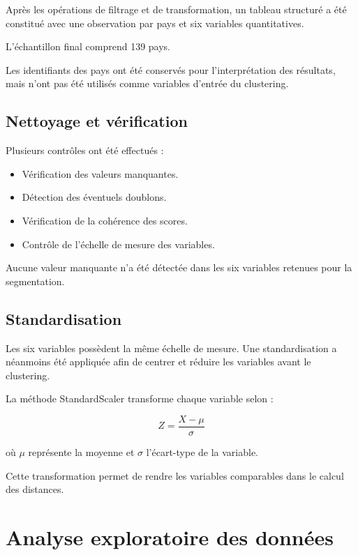 \documentclass[11pt,a4paper]{article}
\begin{document}
Après les opérations de filtrage et de transformation,
un tableau structuré a été constitué avec une observation
par pays et six variables quantitatives.

L'échantillon final comprend 139 pays.

Les identifiants des pays ont été conservés pour l'interprétation
des résultats, mais n'ont pas été utilisés comme variables
d'entrée du clustering.

\subsection{Nettoyage et vérification}

Plusieurs contrôles ont été effectués :

\begin{itemize}
    \item Vérification des valeurs manquantes.
    \item Détection des éventuels doublons.
    \item Vérification de la cohérence des scores.
    \item Contrôle de l'échelle de mesure des variables.
\end{itemize}

Aucune valeur manquante n'a été détectée dans les six variables
retenues pour la segmentation.

\subsection{Standardisation}

Les six variables possèdent la même échelle de mesure.
Une standardisation a néanmoins été appliquée afin de centrer
et réduire les variables avant le clustering.

La méthode StandardScaler transforme chaque variable selon :

\[
Z = \frac{X-\mu}{\sigma}
\]

où $\mu$ représente la moyenne et $\sigma$ l'écart-type
de la variable.

Cette transformation permet de rendre les variables
comparables dans le calcul des distances.


\section{Analyse exploratoire des données}
\end{document}

